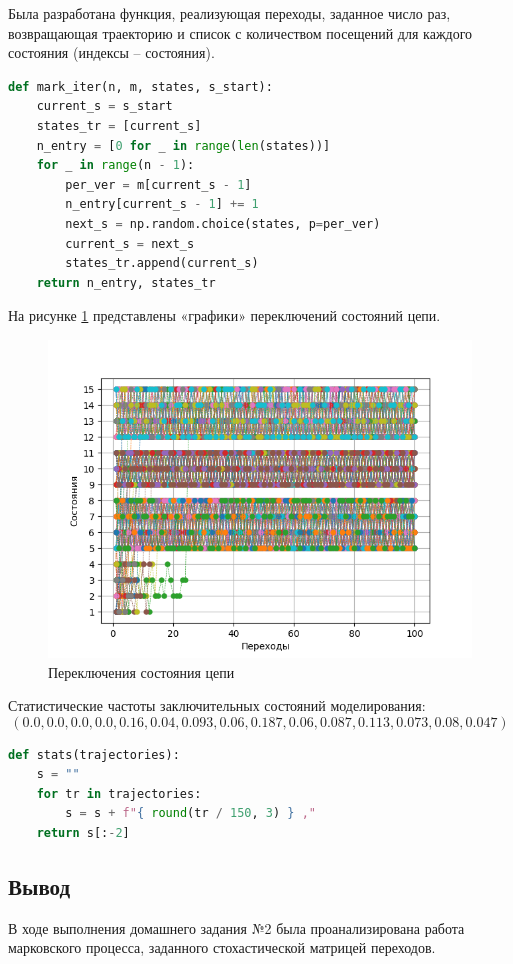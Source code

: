 Была разработана функция, реализующая переходы, заданное число раз, возвращающая траекторию и список с количеством посещений для каждого состояния (индексы -- состояния).

 \begin{lstlisting}[language=python, label=prog,caption={\textit{реализация марковского процесса}}]
def mark_iter(n, m, states, s_start):
    current_s = s_start
    states_tr = [current_s]
    n_entry = [0 for _ in range(len(states))]
    for _ in range(n - 1):
        per_ver = m[current_s - 1]
        n_entry[current_s - 1] += 1
        next_s = np.random.choice(states, p=per_ver)
        current_s = next_s
        states_tr.append(current_s)
    return n_entry, states_tr
\end{lstlisting}

На рисунке \ref{iter} представлены «графики» переключений состояний цепи.

\begin{figure}[H]
\centerline{\includegraphics[width=0.7\columnwidth]{Images/iter.png}}
\caption{Переключения состояния цепи}
\label{iter}
\end{figure}

Статистические частоты заключительных состояний моделирования:
$$( 0.0 ,0.0 ,0.0 ,0.0 ,0.16 ,0.04 ,0.093 ,0.06 ,0.187 ,0.06 ,0.087 ,0.113 ,0.073 ,0.08 ,0.047 )$$

\begin{lstlisting}[language=python, label=prog,caption={\textit{реализация подсчета частот}}]
def stats(trajectories):
    s = ""
    for tr in trajectories:
        s = s + f"{ round(tr / 150, 3) } ,"
    return s[:-2]
\end{lstlisting}

\subsection{Вывод}
В ходе выполнения домашнего задания №2 была проанализирована работа марковского процесса, заданного стохастической матрицей переходов.

